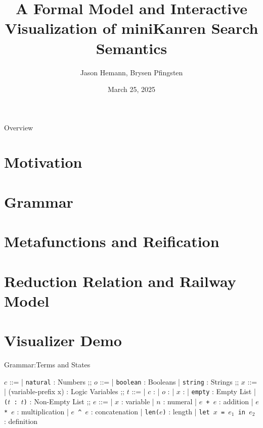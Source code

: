 \documentclass[aspectratio=169,xcolor=dvipsnames]{beamer}
\title{A Formal Model and Interactive Visualization of miniKanren Search Semantics}
\author{Jason Hemann, Brysen Pfingsten}
\institute
{
    Seton Hall University, South Orange, NJ, USA \\	
    \texttt{hemannja@shu.edu, pfingsbr@shu.edu}
}
\date{March 25, 2025} %
\begin{document}
\begin{frame}
    \titlepage
\end{frame}

\begin{frame}{Overview}
    \tableofcontents
\end{frame}

\section{Motivation}

\section{Grammar}

\section{Metafunctions and Reification}

\section{Reduction Relation and Railway Model}

\section{Visualizer Demo}

\begin{frame}{Grammar:Terms and States}

\begin{bnf}
$c$ ::=
| \texttt{natural} : Numbers
;;
$o$ ::=
| \texttt{boolean} : Booleans
| \texttt{string} :  Strings
;;
$x$ ::=
| (variable-prefix x) : Logic Variables 
;;
$t$ ::=
| $c$ : 
| $o$ : 
| $x$ :
| \texttt{empty} : Empty List
| \texttt{($t$ : $t$)} : Non-Empty List
;;
$e$ ::=
| $x$ : variable
| $n$ : numeral
| \texttt{$e$ + $e$} : addition
| \texttt{$e$ * $e$} : multiplication
| \texttt{$e$ \textasciicircum{} $e$} : concatenation
| \texttt{len($e$)} : length
| \texttt{let $x$ = $e_1$ in $e_2$} : definition
\end{bnf}

\end{frame}
\end{document}
